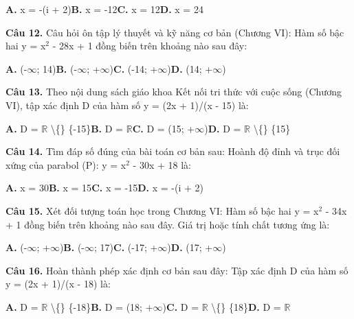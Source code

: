 \documentclass[11pt,a4paper]{article}
\begin{document}
\hspace*{1.5em}\textbf{A.} x = -(i + 2)\quad\quad \textbf{B.} x = -12\quad\quad \textbf{C.} x = 12\quad\quad \textbf{D.} x = 24\par\vspace{2pt}
\textbf{\color{primary} Câu 12.} Câu hỏi ôn tập lý thuyết và kỹ năng cơ bản (Chương VI): Hàm số bậc hai y = x$^2$ - 28x + 1 đồng biến trên khoảng nào sau đây:\par
\hspace*{1.5em}\textbf{A.} (-$\infty$; 14)\quad\quad \textbf{B.} (-$\infty$; +$\infty$)\quad\quad \textbf{C.} (-14; +$\infty$)\quad\quad \textbf{D.} (14; +$\infty$)\par\vspace{2pt}
\textbf{\color{primary} Câu 13.} Theo nội dung sách giáo khoa Kết nối tri thức với cuộc sống (Chương VI), tập xác định D của hàm số y = (2x + 1)/(x - 15) là:\par
\hspace*{1.5em}\textbf{A.} D = $\mathbb{R}$ \textbackslash\{\} \{-15\}\quad\quad \textbf{B.} D = $\mathbb{R}$\quad\quad \textbf{C.} D = (15; +$\infty$)\quad\quad \textbf{D.} D = $\mathbb{R}$ \textbackslash\{\} \{15\}\par\vspace{2pt}
\textbf{\color{primary} Câu 14.} Tìm đáp số đúng của bài toán cơ bản sau: Hoành độ đỉnh và trục đối xứng của parabol (P): y = x$^2$ - 30x + 18 là:\par
\hspace*{1.5em}\textbf{A.} x = 30\quad\quad \textbf{B.} x = 15\quad\quad \textbf{C.} x = -15\quad\quad \textbf{D.} x = -(i + 2)\par\vspace{2pt}
\textbf{\color{primary} Câu 15.} Xét đối tượng toán học trong Chương VI: Hàm số bậc hai y = x$^2$ - 34x + 1 đồng biến trên khoảng nào sau đây. Giá trị hoặc tính chất tương ứng là:\par
\hspace*{1.5em}\textbf{A.} (-$\infty$; +$\infty$)\quad\quad \textbf{B.} (-$\infty$; 17)\quad\quad \textbf{C.} (-17; +$\infty$)\quad\quad \textbf{D.} (17; +$\infty$)\par\vspace{2pt}
\textbf{\color{primary} Câu 16.} Hoàn thành phép xác định cơ bản sau đây: Tập xác định D của hàm số y = (2x + 1)/(x - 18) là:\par
\hspace*{1.5em}\textbf{A.} D = $\mathbb{R}$ \textbackslash\{\} \{-18\}\quad\quad \textbf{B.} D = (18; +$\infty$)\quad\quad \textbf{C.} D = $\mathbb{R}$ \textbackslash\{\} \{18\}\quad\quad \textbf{D.} D = $\mathbb{R}$\par\vspace{2pt}
\end{document}
